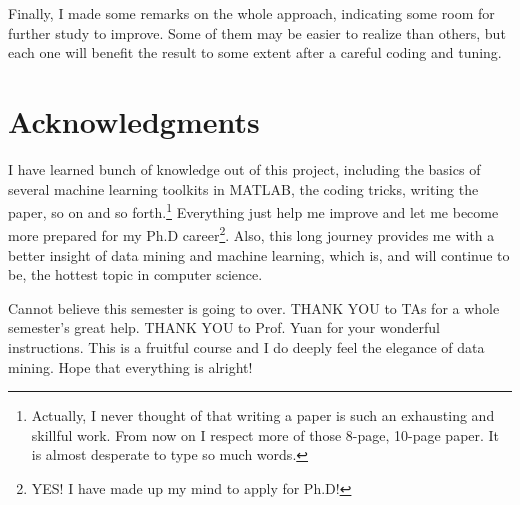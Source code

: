 \documentclass{sig-alternate}
\begin{document}
Finally, I made some remarks on the whole approach, indicating some room for further study to improve. Some of them may be easier to realize than others, but each one will benefit the result to some extent after a careful coding and tuning.

\section{Acknowledgments}
I have learned bunch of knowledge out of this project, including the basics of several machine learning toolkits in MATLAB, the coding tricks, writing the paper, so on and so forth.\footnote{Actually, I never thought of that writing a paper is such an exhausting and skillful work. From now on I respect more of those 8-page, 10-page paper. It is almost desperate to type so much words.} Everything just help me improve and let me become more prepared for my Ph.D career\footnote{YES! I have made up my mind to apply for Ph.D!}. Also, this long journey provides me with a better insight of data mining and machine learning, which is, and will continue to be, the hottest topic in computer science.

Cannot believe this semester is going to over.  THANK YOU to TAs for a whole semester's great help. THANK YOU to Prof. Yuan for your wonderful instructions. This is a fruitful course and I do deeply feel the elegance of data mining. Hope that everything is alright!

%

%
%
\end{document}
